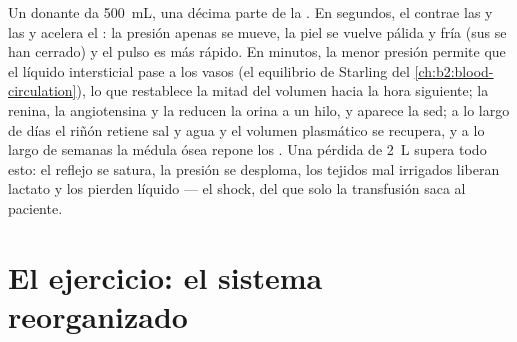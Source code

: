 \begin{example}\label{ex:b2:blood-pressure:haemorrhage}
Un donante da \qty{500}{mL}, una décima parte de la . En segundos, el
 contrae las  y las  y acelera el : la
presión apenas se mueve, la piel se vuelve pálida y fría (sus 
se han cerrado) y el pulso es más rápido. En minutos, la menor presión
 permite que el líquido intersticial pase a los vasos (el
equilibrio de Starling del \cref{ch:b2:blood-circulation}), lo que
restablece la mitad del volumen hacia la hora siguiente; la renina, la
angiotensina y la  reducen la orina a un hilo, y
aparece la sed; a lo largo de días el riñón retiene sal y agua y el volumen
plasmático se recupera, y a lo largo de semanas la médula ósea repone los
. Una pérdida de \qty{2}{L} supera todo esto: el reflejo se
satura, la presión se desploma, los tejidos mal irrigados liberan lactato
y los  pierden líquido --- el shock, del que solo la transfusión
saca al paciente.
\end{example}

\section{El ejercicio: el sistema reorganizado}

